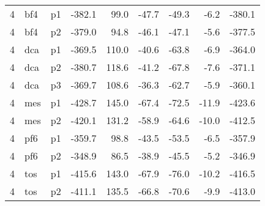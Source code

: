 \documentclass[a4paper]{article}
\begin{document}
\begin{table}[ht]
\begin{tabular}{rllrrrrrr}
   4 & bf4 & p1 & -382.1 & 99.0 & -47.7 & -49.3 & -6.2 & -380.1 \\ 
   4 & bf4 & p2 & -379.0 & 94.8 & -46.1 & -47.1 & -5.6 & -377.5 \\ 
   4 & dca & p1 & -369.5 & 110.0 & -40.6 & -63.8 & -6.9 & -364.0 \\ 
   4 & dca & p2 & -380.7 & 118.6 & -41.2 & -67.8 & -7.6 & -371.1 \\ 
   4 & dca & p3 & -369.7 & 108.6 & -36.3 & -62.7 & -5.9 & -360.1 \\ 
   4 & mes & p1 & -428.7 & 145.0 & -67.4 & -72.5 & -11.9 & -423.6 \\ 
   4 & mes & p2 & -420.1 & 131.2 & -58.9 & -64.6 & -10.0 & -412.5 \\ 
   4 & pf6 & p1 & -359.7 & 98.8 & -43.5 & -53.5 & -6.5 & -357.9 \\ 
   4 & pf6 & p2 & -348.9 & 86.5 & -38.9 & -45.5 & -5.2 & -346.9 \\ 
   4 & tos & p1 & -415.6 & 143.0 & -67.9 & -76.0 & -10.2 & -416.5 \\ 
   4 & tos & p2 & -411.1 & 135.5 & -66.8 & -70.6 & -9.9 & -413.0 \\ 
   \hline
\end{tabular}
\end{table}
\end{document}
